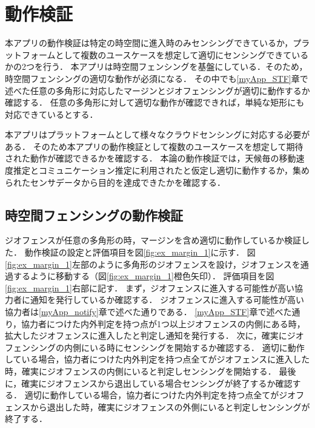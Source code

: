 \chapter{動作検証}
\thispagestyle{myheadings}
本アプリの動作検証は特定の時空間に進入時のみセンシングできているか，プラットフォームとして複数のユースケースを想定して適切にセンシングできているかの2つを行う．
本アプリは時空間フェンシングを基盤にしている．そのため，時空間フェンシングの適切な動作が必須になる．
その中でも\ref{myApp_STF}章で述べた任意の多角形に対応したマージンとジオフェンシングが適切に動作するか確認する．
任意の多角形に対して適切な動作が確認できれば，単純な矩形にも対応できているとする．

本アプリはプラットフォームとして様々なクラウドセンシングに対応する必要がある．
そのため本アプリの動作検証として複数のユースケースを想定して期待された動作が確認できるかを確認する．
本論の動作検証では，天候毎の移動速度推定とコミュニケーション推定に利用されたと仮定し適切に動作するか，集められたセンサデータから目的を達成できたかを確認する．

\section{時空間フェンシングの動作検証}
ジオフェンスが任意の多角形の時，マージンを含め適切に動作しているか検証した．
動作検証の設定と評価項目を図\ref{fig:ex_margin_1}に示す．
図\ref{fig:ex_margin_1}左部のように多角形のジオフェンスを設け，ジオフェンスを通過するように移動する（図\ref{fig:ex_margin_1}橙色矢印）．
評価項目を図\ref{fig:ex_margin_1}右部に記す．
まず，ジオフェンスに進入する可能性が高い協力者に通知を発行しているか確認する．
ジオフェンスに進入する可能性が高い協力者は\ref{myApp_notify}章で述べた通りである．
\ref{myApp_STF}章で述べた通り，協力者につけた内外判定を持つ点が1つ以上ジオフェンスの内側にある時，拡大したジオフェンスに進入したと判定し通知を発行する．
次に，確実にジオフェンシングの内側にいる時にセンシングを開始するか確認する．
適切に動作している場合，協力者につけた内外判定を持つ点全てがジオフェンスに進入した時，確実にジオフェンスの内側にいると判定しセンシングを開始する．
最後に，確実にジオフェンスから退出している場合センシングが終了するか確認する．
適切に動作している場合，協力者につけた内外判定を持つ点全てがジオフェンスから退出した時，確実にジオフェンスの外側にいると判定しセンシングが終了する．

